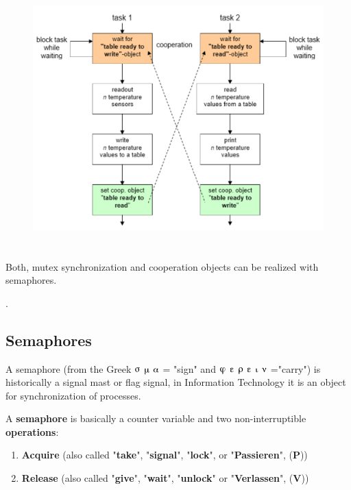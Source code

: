 \begin{enumerate}
 	\begin{figure}[h]
    \centering
    \includegraphics[width=14cm, height=10cm]{Images/image104.png}
    \label{fig:Fig 50}
    \end{figure}
    
Both, mutex synchronization and cooperation objects can be realized with semaphores.
\end{enumerate}

\os{\newpage}
.
\nsl{\newpage}


\subsection{Semaphores}

A semaphore (from the Greek $\sigmaup$ $\muup$ $\alphaup$ = "sign" and $\varphiup$ $\varepsilonup$ $\rhoup$ $\varepsilonup$ $\iotaup$ $\nuup$ ="carry") is historically a signal mast or flag signal, in Information Technology it is an object for synchronization of processes.


A \textbf{semaphore} is basically a counter variable and two non-interruptible \textbf{operations}:  

\begin{enumerate}
\item  \textbf{Acquire}   (also called "\textbf{take}", "\textbf{signal}",  "\textbf{lock}",     or "\textbf{Passieren}", (\textbf{P}))
\item  \textbf{Release}  (also called "\textbf{give}", "\textbf{wait}",  "\textbf{unlock}"  or "\textbf{Verlassen}", (\textbf{V}))
\end{enumerate}

